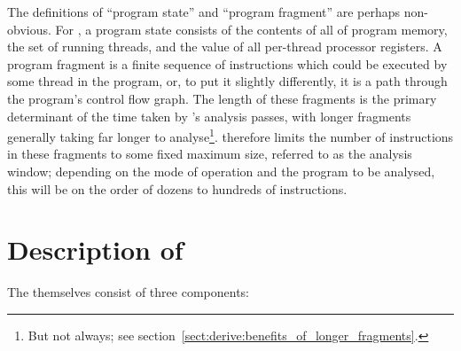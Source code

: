 The definitions of ``program state'' and ``program fragment'' are
perhaps non-obvious.  For {\technique}, a program state consists of
the contents of all of program memory, the set of running threads, and
the value of all per-thread processor registers.  A program fragment
is a finite sequence of instructions which could be executed by some
thread in the program, or, to put it slightly differently, it is a
path through the program's control flow graph.  The length of these
fragments is the primary determinant of the time taken by
{\technique}'s analysis passes, with longer fragments generally taking
far longer to analyse\footnote{But not always; see
  section~\ref{sect:derive:benefits_of_longer_fragments}.}.
{\Technique} therefore limits the number of instructions in these
fragments to some fixed maximum size, referred to as the analysis
window; depending on the mode of operation and the program to be
analysed, this will be on the order of dozens to hundreds of
instructions.

\section{Description of \StateMachines}
\label{sect:derive:description}


The {\StateMachines} themselves consist of three components:

